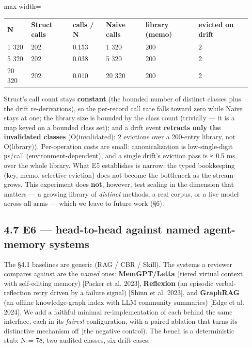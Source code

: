 \documentclass[11pt]{article}
\begin{document}
\begin{center}\small\begin{adjustbox}{max width=\linewidth}\begin{tabular}{llllll}\toprule
N & Struct calls & calls / N & Naive calls & library (memo) & evicted on drift \\ \midrule
1 320 & 202 & 0.153 & 1 320 & 200 & 2 \\
5 320 & 202 & 0.038 & 5 320 & 200 & 2 \\
20 320 & 202 & 0.010 & 20 320 & 200 & 2 \\
\bottomrule\end{tabular}\end{adjustbox}\end{center}

Struct's call count stays \textbf{constant} (the bounded number of distinct classes plus the drift re-derivations), so the per-record call rate falls toward zero while Naive stays at one; the library size is bounded by the class count (trivially — it is a map keyed on a bounded class set); and a drift event \textbf{retracts only the invalidated classes} (O(invalidated): 2 evictions over a 200-entry library, not O(library)). Per-operation costs are small: canonicalization is low-single-digit µs/call (environment-dependent), and a single drift's eviction pass is ≈ 0.5 ms over the whole library. What E5 establishes is narrow: the typed bookkeeping (key, memo, selective eviction) does not become the bottleneck as the stream grows. This experiment does \textbf{not}, however, test scaling in the dimension that matters — a growing library of \emph{distinct} methods, a real corpus, or a live model across all arms — which we leave to future work (§6).

\subsection*{4.7 E6 — head-to-head against named agent-memory systems}

The §4.1 baselines are generic (RAG / CBR / Skill). The systems a reviewer compares against are the \emph{named} ones: \textbf{MemGPT/Letta} (tiered virtual context with self-editing memory) [Packer et al. 2023], \textbf{Reflexion} (an episodic verbal-reflection retry driven by a failure signal) [Shinn et al. 2023], and \textbf{GraphRAG} (an offline knowledge-graph index with LLM community summaries) [Edge et al. 2024]. We add a faithful minimal re-implementation of each behind the same interface, each in its \emph{fairest} configuration, with a paired ablation that turns its distinctive mechanism off (the negative control). The bench is a deterministic stub: N = 78, two audited classes, six drift cases:
\end{document}
